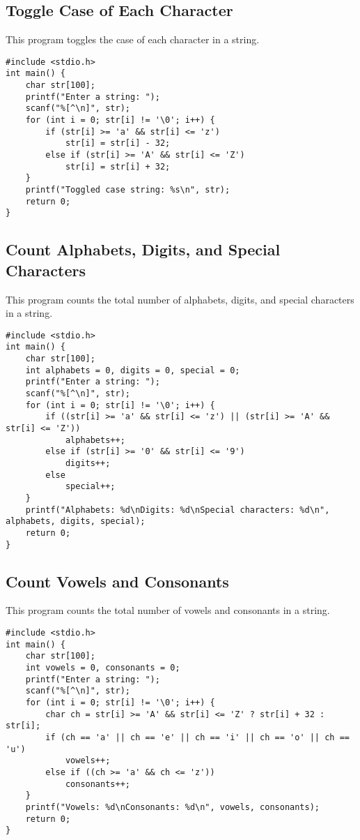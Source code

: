 \documentclass[a4paper,12pt]{article}
\begin{document}
\subsection{Toggle Case of Each Character}
This program toggles the case of each character in a string.
\begin{lstlisting}[caption={Toggle Case of Each Character}]
#include <stdio.h>
int main() {
    char str[100];
    printf("Enter a string: ");
    scanf("%[^\n]", str);
    for (int i = 0; str[i] != '\0'; i++) {
        if (str[i] >= 'a' && str[i] <= 'z')
            str[i] = str[i] - 32;
        else if (str[i] >= 'A' && str[i] <= 'Z')
            str[i] = str[i] + 32;
    }
    printf("Toggled case string: %s\n", str);
    return 0;
}
\end{lstlisting}
\clearpage

\subsection{Count Alphabets, Digits, and Special Characters}
This program counts the total number of alphabets, digits, and special characters in a string.
\begin{lstlisting}[caption={Count Alphabets, Digits, and Special Characters}]
#include <stdio.h>
int main() {
    char str[100];
    int alphabets = 0, digits = 0, special = 0;
    printf("Enter a string: ");
    scanf("%[^\n]", str);
    for (int i = 0; str[i] != '\0'; i++) {
        if ((str[i] >= 'a' && str[i] <= 'z') || (str[i] >= 'A' && str[i] <= 'Z'))
            alphabets++;
        else if (str[i] >= '0' && str[i] <= '9')
            digits++;
        else
            special++;
    }
    printf("Alphabets: %d\nDigits: %d\nSpecial characters: %d\n", alphabets, digits, special);
    return 0;
}
\end{lstlisting}
\clearpage

\subsection{Count Vowels and Consonants}
This program counts the total number of vowels and consonants in a string.
\begin{lstlisting}[caption={Count Vowels and Consonants}]
#include <stdio.h>
int main() {
    char str[100];
    int vowels = 0, consonants = 0;
    printf("Enter a string: ");
    scanf("%[^\n]", str);
    for (int i = 0; str[i] != '\0'; i++) {
        char ch = str[i] >= 'A' && str[i] <= 'Z' ? str[i] + 32 : str[i];
        if (ch == 'a' || ch == 'e' || ch == 'i' || ch == 'o' || ch == 'u')
            vowels++;
        else if ((ch >= 'a' && ch <= 'z'))
            consonants++;
    }
    printf("Vowels: %d\nConsonants: %d\n", vowels, consonants);
    return 0;
}
\end{lstlisting}
\clearpage
\end{document}
